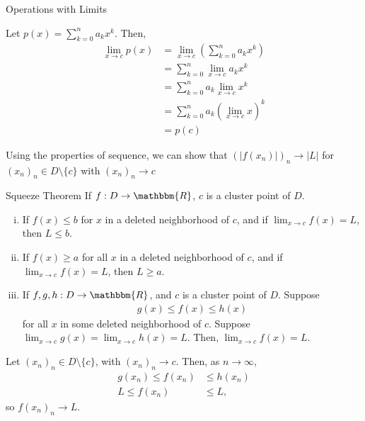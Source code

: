 \documentclass[10pt]{extarticle}
\newcommand{\R}{\mathbbm{R}}
\begin{document}
\begin{problem}{Operations with Limits}
\begin{description}[font=\normalfont]
      \item[Proof of (d):] Let $\displaystyle p(x) = \sum_{k=0}^{n} a_kx^k$. Then,
        \begin{align*}
          \lim_{x\rightarrow c}p(x) &= \lim_{x\rightarrow c}\left(\sum_{k=0}^{n}a_kx^k\right)\\
                                    &= \sum_{k=0}^{n}\lim_{x\rightarrow c}a_kx^k \tag*{(a)(i)}\\
                                    &= \sum_{k=0}^{n}a_k\lim_{x\rightarrow c}x^k \tag*{(a)(ii)}\\
                                    &= \sum_{k=0}^{n}a_k\left(\lim_{x\rightarrow c} x\right)^k \tag*{(a)(i)}\\
                                    &= p(c)
        \end{align*}
      \item[Proof of (b)] Using the properties of sequence, we can show that $\left(|f(x_n)|\right)_n \rightarrow |L|$ for $(x_n)_n \in D\setminus \{c\}$ with $(x_n)_n\rightarrow c$
    \end{description}
  \end{problem}
  \begin{problem}{Squeeze Theorem}
    If $f:D\rightarrow \R$, $c$ is a cluster point of $D$.
    \begin{enumerate}[(i)]
      \item If $f(x) \leq b$ for $x$ in a deleted neighborhood of $c$, and if $\lim_{x\rightarrow c}f(x) = L$, then $L \leq b$.
      \item If $f(x) \geq a$ for all $x$ in a deleted neighborhood of $c$, and if $\lim_{x\rightarrow c}f(x) = L$, then $L \geq a$.
      \item If $f,g,h: D\rightarrow \R$, and $c$ is a cluster point of $D$. Suppose
        \begin{align*}
          g(x) \leq f(x) \leq h(x)
        \end{align*}
        for all $x$ in some deleted neighborhood of $c$. Suppose $\lim_{x\rightarrow c}g(x) = \lim_{x\rightarrow c}h(x) = L$. Then, $\lim_{x\rightarrow c}f(x) = L$.
    \end{enumerate}
    \tcblower
    \begin{description}[font=\normalfont]
      \item[Proof of (iii)] Let $(x_n)_n\in D\setminus \{c\}$, with $(x_n)_n \rightarrow c$. Then, as $n\rightarrow \infty$,
        \begin{align*}
          g(x_n) \leq f(x_n) &\leq h(x_n)\\
          L \leq f(x_n) &\leq L,
        \end{align*}
        so $f(x_n)_n \rightarrow L$.
    \end{description}
  \end{problem}
\end{document}
